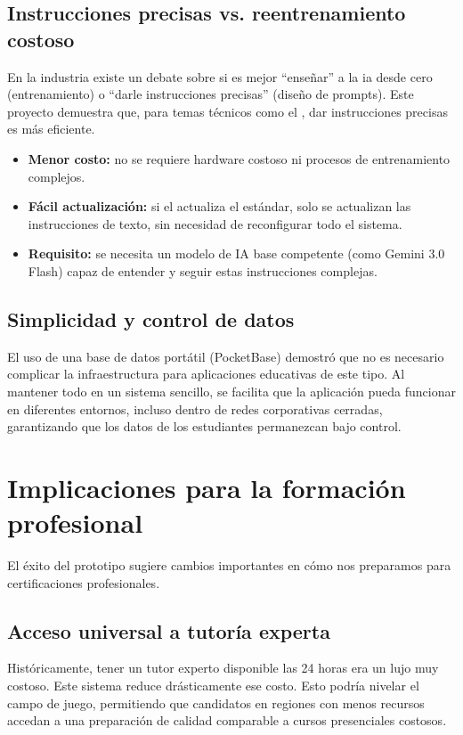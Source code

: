 \subsection{Instrucciones precisas vs. reentrenamiento costoso}
En la industria existe un debate sobre si es mejor \enquote{enseñar} a la \gls{ia} desde cero (entrenamiento) o \enquote{darle instrucciones precisas} (diseño de prompts). Este proyecto demuestra que, para temas técnicos como el , dar instrucciones precisas es más eficiente.
\begin{itemize}
\item   \textbf{Menor costo:} no se requiere hardware costoso ni procesos de entrenamiento complejos.
\item   \textbf{Fácil actualización:} si el  actualiza el estándar, solo se actualizan las instrucciones de texto, sin necesidad de reconfigurar todo el sistema.
\item   \textbf{Requisito:} se necesita un modelo de IA base competente (como Gemini 3.0 Flash) capaz de entender y seguir estas instrucciones complejas.
\end{itemize}

\subsection{Simplicidad y control de datos}
El uso de una base de datos portátil (PocketBase) demostró que no es necesario complicar la infraestructura para aplicaciones educativas de este tipo. Al mantener todo en un sistema sencillo, se facilita que la aplicación pueda funcionar en diferentes entornos, incluso dentro de redes corporativas cerradas, garantizando que los datos de los estudiantes permanezcan bajo control.

\section{Implicaciones para la formación profesional}

El éxito del prototipo sugiere cambios importantes en cómo nos preparamos para certificaciones profesionales.

\subsection{Acceso universal a tutoría experta}
Históricamente, tener un tutor experto disponible las 24 horas era un lujo muy costoso. Este sistema reduce drásticamente ese costo. Esto podría nivelar el campo de juego, permitiendo que candidatos en regiones con menos recursos accedan a una preparación de calidad comparable a cursos presenciales costosos.

